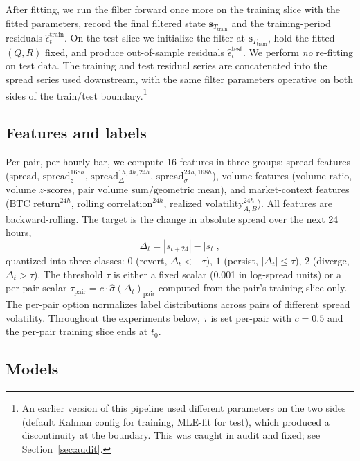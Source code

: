 \documentclass[11pt]{article}
\begin{document}
After fitting, we run the filter forward once more on the training slice
with the fitted parameters, record the final filtered state
$\mathbf{s}_{T_{\text{train}}}$ and the training-period residuals
$\hat{\epsilon}_t^{\text{train}}$. On the test slice we initialize the
filter at $\mathbf{s}_{T_{\text{train}}}$, hold the fitted $(Q, R)$
fixed, and produce out-of-sample residuals
$\hat{\epsilon}_t^{\text{test}}$. We perform \emph{no} re-fitting on
test data. The training and test residual series are concatenated into
the spread series used downstream, with the same filter parameters
operative on both sides of the train/test boundary.\footnote{An earlier
version of this pipeline used different parameters on the two sides
(default Kalman config for training, MLE-fit for test), which produced
a discontinuity at the boundary. This was caught in audit and fixed;
see Section~\ref{sec:audit}.}

\subsection{Features and labels}

Per pair, per hourly bar, we compute 16 features in three groups:
spread features ($\text{spread}$, $\text{spread}_z^{168h}$,
$\text{spread}_{\Delta}^{1h, 4h, 24h}$, $\text{spread}_{\sigma}^{24h, 168h}$),
volume features ($\text{volume ratio}$, $\text{volume }z\text{-scores}$,
$\text{pair volume sum/geometric mean}$), and market-context features
($\text{BTC return}^{24h}$, $\text{rolling correlation}^{24h}$,
$\text{realized volatility}^{24h}_{A, B}$). All features are
backward-rolling. The target is the change in absolute spread over the
next 24 hours,
\begin{equation}
    \Delta_t = |s_{t+24}| - |s_t|,
\end{equation}
quantized into three classes: $0$ (revert, $\Delta_t < -\tau$), $1$
(persist, $|\Delta_t| \leq \tau$), $2$ (diverge, $\Delta_t > \tau$).
The threshold $\tau$ is either a fixed scalar (0.001 in log-spread
units) or a per-pair scalar
$\tau_{\text{pair}} = c \cdot \widehat{\sigma}(\Delta_t)_{\text{pair}}$
computed from the pair's training slice only. The per-pair option
normalizes label distributions across pairs of different spread
volatility. Throughout the experiments below, $\tau$ is set per-pair
with $c = 0.5$ and the per-pair training slice ends at $t_0$.

\subsection{Models}
\end{document}
